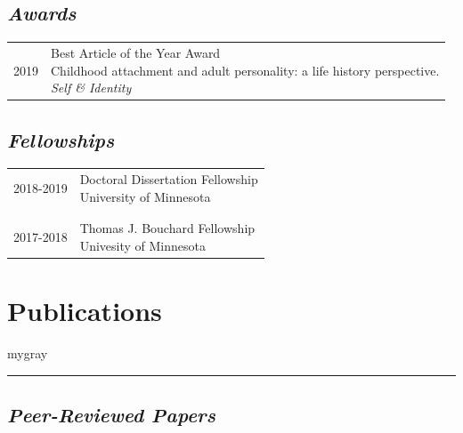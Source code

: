 \documentclass[
]{article}
\begin{document}
\hypertarget{awards}{%
\subsection{\texorpdfstring{\emph{Awards}}{Awards}}\label{awards}}

\begin{longtable}{p{2.25cm}p{5.5in}}
2019 & \parbox[t]{5.0in}{Best Article of the Year Award \newline Childhood attachment and adult personality: a life history perspective. \newline \textit{Self \& Identity}} \\
\end{longtable}

\hypertarget{fellowships}{%
\subsection{\texorpdfstring{\emph{Fellowships}}{Fellowships}}\label{fellowships}}

\begin{longtable}{p{2.25cm}p{5.5in}}
2018-2019 & \parbox[t]{5.0in}{Doctoral Dissertation Fellowship \newline University of Minnesota} \\\\& \\
2017-2018 & \parbox[t]{5.0in}{Thomas J. Bouchard Fellowship \newline Univesity of Minnesota} \\
\end{longtable}

\vspace{1ex}

\hypertarget{publications}{%
\section{\texorpdfstring{\textbf{Publications}}{Publications}}\label{publications}}

\vspace{1ex}
\begin{color}{mygray}\hrule\end{color}
\vspace{1ex}

\hypertarget{peer-reviewed-papers}{%
\subsection{\texorpdfstring{\emph{Peer-Reviewed
Papers}}{Peer-Reviewed Papers}}\label{peer-reviewed-papers}}
\end{document}
